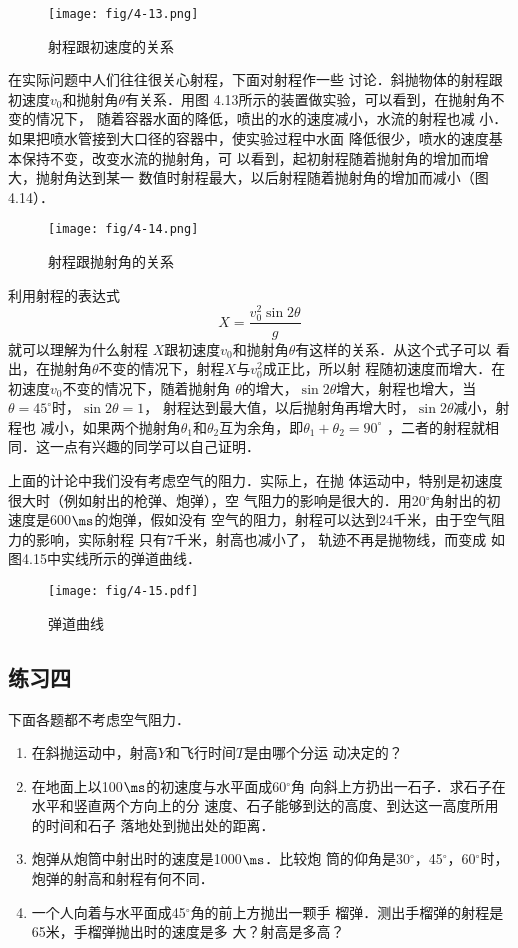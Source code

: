 \begin{figure}[htp]
    \centering
    \texttt{[image: fig/4-13.png]}
    \caption{射程跟初速度的关系}
    \end{figure}

    在实际问题中人们往往很关心射程，下面对射程作一些
讨论．斜抛物体的射程跟初速度$v_0$和抛射角$\theta$有关系．用图
4.13所示的装置做实验，可以看到，在抛射角不变的情况下，
随着容器水面的降低，喷出的水的速度减小，水流的射程也减
小．如果把喷水管接到大口径的容器中，使实验过程中水面
降低很少，喷水的速度基本保持不变，改变水流的抛射角，可
以看到，起初射程随着抛射角的增加而增大，抛射角达到某一
数值时射程最大，以后射程随着抛射角的增加而减小（图4.14）．

\begin{figure}[htp]
    \centering
    \texttt{[image: fig/4-14.png]}
    \caption{射程跟抛射角的关系}
    \end{figure}

利用射程的表达式
\[X=\frac{v_0^2\sin 2\theta}{g} \]
就可以理解为什么射程
$X$跟初速度$v_0$和抛射角$\theta$有这样的关系．从这个式子可以
看出，在抛射角$\theta$不变的情况下，射程$X$与$v^2_0$成正比，所以射
程随初速度而增大．在初速度$v_0$不变的情况下，随着抛射角
$\theta$的增大，$\sin 2\theta$增大，射程也增大，当$\theta=45^{\circ}$时，$\sin 2\theta=1$，
射程达到最大值，以后抛射角再增大时，$\sin 2\theta$减小，射程也
减小，如果两个抛射角$\theta_1$和$\theta_2$互为余角，即$\theta_1+\theta_2=90^\circ$
，二者的射程就相同．这一点有兴趣的同学可以自己证明．

    上面的计论中我们没有考虑空气的阻力．实际上，在抛
体运动中，特别是初速度很大时（例如射出的枪弹、炮弹），空
气阻力的影响是很大的．用20$^\circ$角射出的初速度是600$\ms$的炮弹，假如没有 空气的阻力，射程可以达到24千米，由于空气阻力的影响，实际射程
只有7千米，射高也减小了，
轨迹不再是抛物线，而变成
如图4.15中实线所示的弹道曲线．

\begin{figure}[htp]
    \centering
    \texttt{[image: fig/4-15.pdf]}
    \caption{弹道曲线}
    \end{figure}

\subsection*{练习四}
    下面各题都不考虑空气阻力．
\begin{enumerate}
 \item 在斜抛运动中，射高$Y$和飞行时间$T$是由哪个分运
动决定的？
 \item 在地面上以100$\ms$的初速度与水平面成60$^\circ$角
向斜上方扔出一石子．求石子在水平和竖直两个方向上的分
速度、石子能够到达的高度、到达这一高度所用的时间和石子
落地处到抛出处的距离．
  \item 炮弹从炮筒中射出时的速度是1000$\ms$．比较炮
筒的仰角是30$^\circ$，45$^\circ$，60$^\circ$时，炮弹的射高和射程有何不同．
  \item 一个人向着与水平面成45$^\circ$角的前上方抛出一颗手
榴弹．测出手榴弹的射程是65米，手榴弹抛出时的速度是多
大？射高是多高？
\end{enumerate}

